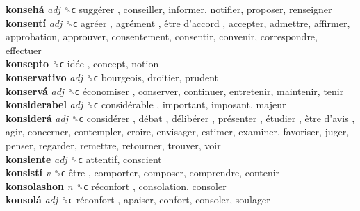 \textbf{konsehá} \emph{adj}  ␝ϲ   suggérer , conseiller, informer, notifier, proposer, renseigner  \\
\textbf{konsentí} \emph{adj}  ␝ϲ   agréer ,  agrément ,  être d’accord , accepter, admettre, affirmer, approbation, approuver, consentement, consentir, convenir, correspondre, effectuer  \\
\textbf{konsepto} ␝ϲ   idée , concept, notion  \\
\textbf{konservativo} \emph{adj}  ␝ϲ  bourgeois, droitier, prudent  \\
\textbf{konservá} \emph{adj}  ␝ϲ   économiser , conserver, continuer, entretenir, maintenir, tenir  \\
\textbf{konsiderabel} \emph{adj}  ␝ϲ   considérable , important, imposant, majeur  \\
\textbf{konsiderá} \emph{adj}  ␝ϲ   considérer ,  débat ,  délibérer ,  présenter ,  étudier ,  être d’avis , agir, concerner, contempler, croire, envisager, estimer, examiner, favoriser, juger, penser, regarder, remettre, retourner, trouver, voir  \\
\textbf{konsiente} \emph{adj}  ␝ϲ  attentif, conscient  \\
\textbf{konsistí} \emph{v}  ␝ϲ   être , comporter, composer, comprendre, contenir  \\
\textbf{konsolashon} \emph{n}  ␝ϲ   réconfort , consolation, consoler  \\
\textbf{konsolá} \emph{adj}  ␝ϲ   réconfort , apaiser, confort, consoler, soulager  \\
